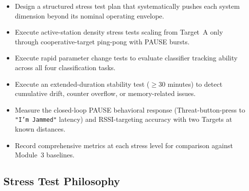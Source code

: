 \documentclass[11pt,letterpaper]{article}
\begin{document}
	\begin{itemize}[leftmargin=2em]
		\item Design a structured stress test plan that systematically pushes each system dimension beyond its nominal operating envelope.
		\item Execute active-station density stress tests scaling from Target~A only through cooperative-target ping-pong with PAUSE bursts.
		\item Execute rapid parameter change tests to evaluate classifier tracking ability across all four classification tasks.
		\item Execute an extended-duration stability test ($\geq$30 minutes) to detect cumulative drift, counter overflow, or memory-related issues.
		\item Measure the closed-loop PAUSE behavioral response (Threat-button-press to \texttt{"I'm Jammed"} latency) and RSSI-targeting accuracy with two Targets at known distances.
		\item Record comprehensive metrics at each stress level for comparison against Module~3 baselines.
	\end{itemize}

	\subsection{Stress Test Philosophy}
\end{document}

